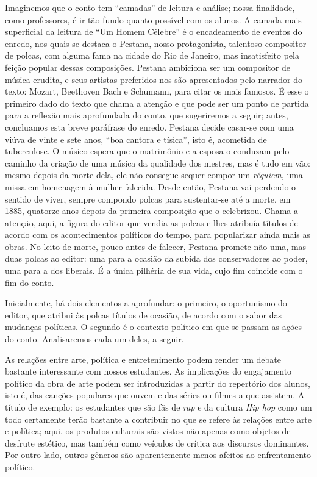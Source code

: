 \documentclass[11pt]{extarticle}
\begin{document}
Imaginemos que o conto tem ``camadas'' de leitura e análise; nossa
finalidade, como professores, é ir tão fundo quanto possível com os
alunos. A camada mais superficial da leitura de ``Um Homem Célebre'' é o
encadeamento de eventos do enredo, nos quais se destaca o Pestana, nosso
protagonista, talentoso compositor de polcas, com alguma fama na cidade
do Rio de Janeiro, mas insatisfeito pela feição popular dessas
composições. Pestana ambiciona ser um compositor de música erudita, e
seus artistas preferidos nos são apresentados pelo narrador do texto:
Mozart, Beethoven Bach e Schumann, para citar os mais famosos. É esse o
primeiro dado do texto que chama a atenção e que pode ser um ponto de
partida para a reflexão mais aprofundada do conto, que sugeriremos a
seguir; antes, concluamos esta breve paráfrase do enredo. Pestana decide
casar-se com uma viúva de vinte e sete anos, ``boa cantora e tísica'',
isto é, acometida de tuberculose. O músico espera que o matrimônio e a
esposa o conduzam pelo caminho da criação de uma música da qualidade dos
mestres, mas é tudo em vão: mesmo depois da morte dela, ele não consegue
sequer compor um \emph{réquiem}, uma missa em homenagem à mulher
falecida. Desde então, Pestana vai perdendo o sentido de viver, sempre
compondo polcas para sustentar-se até a morte, em 1885, quatorze anos
depois da primeira composição que o celebrizou. Chama a atenção, aqui, a
figura do editor que vendia as polcas e lhes atribuía títulos de acordo
com os acontecimentos políticos do tempo, para popularizar ainda mais as
obras. No leito de morte, pouco antes de falecer, Pestana promete não
uma, mas duas polcas ao editor: uma para a ocasião da subida dos
conservadores ao poder, uma para a dos liberais. É a única pilhéria de
sua vida, cujo fim coincide com o fim do conto.


Inicialmente, há dois elementos a aprofundar: o primeiro, o oportunismo
do editor, que atribui às polcas títulos de ocasião, de acordo com o
sabor das mudanças políticas. O segundo é o contexto político em que se
passam as ações do conto. Analisaremos cada um deles, a seguir.

As relações entre arte, política e entretenimento podem render um debate
bastante interessante com nossos estudantes. As implicações do
engajamento político da obra de arte podem ser introduzidas a partir do
repertório dos alunos, isto é, das canções populares que ouvem e das
séries ou filmes a que assistem. A título de exemplo: os estudantes que
são fãs de \emph{rap} e da cultura \emph{Hip hop} como um todo
certamente terão bastante a contribuir no que se refere às relações
entre arte e política; aqui, os produtos culturais são vistos não apenas
como objetos de desfrute estético, mas também como veículos de crítica
aos discursos dominantes. Por outro lado, outros gêneros são
aparentemente menos afeitos ao enfrentamento político.
\end{document}
